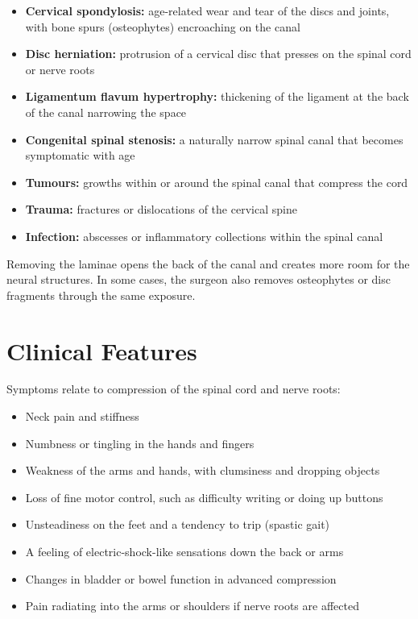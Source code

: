 \begin{itemize}
    \item \textbf{Cervical spondylosis:} age-related wear and tear of the discs and joints, with bone spurs (osteophytes) encroaching on the canal
    \item \textbf{Disc herniation:} protrusion of a cervical disc that presses on the spinal cord or nerve roots
    \item \textbf{Ligamentum flavum hypertrophy:} thickening of the ligament at the back of the canal narrowing the space
    \item \textbf{Congenital spinal stenosis:} a naturally narrow spinal canal that becomes symptomatic with age
    \item \textbf{Tumours:} growths within or around the spinal canal that compress the cord
    \item \textbf{Trauma:} fractures or dislocations of the cervical spine
    \item \textbf{Infection:} abscesses or inflammatory collections within the spinal canal
\end{itemize}

Removing the laminae opens the back of the canal and creates more room for the neural structures. In some cases, the surgeon also removes osteophytes or disc fragments through the same exposure.

\section*{Clinical Features}
Symptoms relate to compression of the spinal cord and nerve roots:

\begin{itemize}
    \item Neck pain and stiffness
    \item Numbness or tingling in the hands and fingers
    \item Weakness of the arms and hands, with clumsiness and dropping objects
    \item Loss of fine motor control, such as difficulty writing or doing up buttons
    \item Unsteadiness on the feet and a tendency to trip (spastic gait)
    \item A feeling of electric-shock-like sensations down the back or arms
    \item Changes in bladder or bowel function in advanced compression
    \item Pain radiating into the arms or shoulders if nerve roots are affected
\end{itemize}

